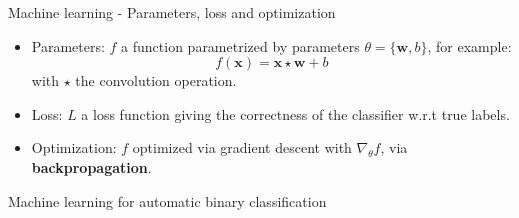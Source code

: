 \documentclass[10pt,aspectratio=169]{beamer}
\newcommand{\grad}{\nabla}
\begin{document}
\begin{frame}{Machine learning - Parameters, loss and optimization}
    \pause

    \begin{itemize}
        \setlength\itemsep{2em}

        \item \alert{Parameters}: $f$ a function parametrized by parameters $\theta = \{\mathbf{w}, b \}$, for example:
            \begin{equation}
                f(\mathbf{x}) = \mathbf{x} \star \mathbf{w} + b
            \end{equation}
            with $\star$ the convolution operation.

        \pause
        \item \alert{Loss}: $L$ a loss function giving the correctness of the classifier w.r.t true labels.

        \pause
        \item \alert{Optimization}: $f$ optimized via gradient descent with $\grad_\theta f$, via \textbf{backpropagation}.
                
    \end{itemize}

\end{frame}


\begin{frame}{Machine learning for automatic binary classification}
\end{frame}
\end{document}
